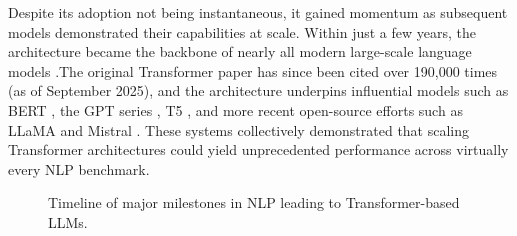 Despite its adoption not being instantaneous, it gained momentum as subsequent models demonstrated their capabilities at scale. Within just a few years, the architecture became the backbone of nearly all modern large-scale language models \cite{wolf2020transformers}.The original Transformer paper has since been cited over 190,000 times (as of September 2025), and the architecture underpins influential models such as BERT \cite{devlin2019bert}, the GPT series \cite{radford2018improving, brown2020language}, T5 \cite{raffel2020exploring}, and more recent open-source efforts such as LLaMA \cite{touvron2023llama} and Mistral \cite{jiang2023mistral7b}. These systems collectively demonstrated that scaling Transformer architectures could yield unprecedented performance across virtually every NLP benchmark.


\begin{figure}[H]
    \centering
    \caption{Timeline of major milestones in NLP leading to Transformer-based LLMs.}
    \label{fig:nlp-timeline}
\end{figure}


